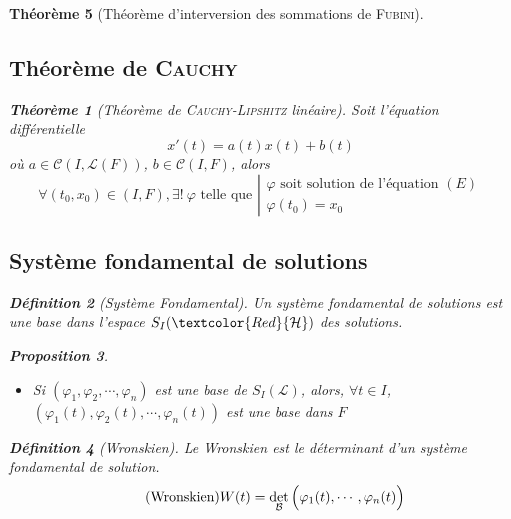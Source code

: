 \documentclass[11pt,a4paper]{report}
\newtheorem{theorem}{Théorème}[chapter]
\newtheorem{itheorem}[theorem]{Théorème}
\newtheorem{prop}[theorem]{Proposition}
\theoremstyle{definition}
\newtheorem{dfn}[theorem]{Définition}
\begin{document}
\begin{theorem}[Théorème d'interversion des sommations de \textsc{Fubini}]
{{\subsection{Théorème de \textsc{Cauchy}} %
\label{sub:theoreme_de_Cauchy}
\begin{itheorem}[Théorème de \textsc{Cauchy-Lipshitz} linéaire]\label{th:CauchyLipschitz}
Soit l'équation différentielle 
\begin{equation}\tag{$E$}
 x'(t) = a(t) x(t) + b(t)
\end{equation}
où $a \in \mathcal{C}\left( I,\mathscr{L}(F)\right)$, $b\in \mathcal{C}(I,F)$, alors
\begin{equation}
    \forall (t_0,x_0) \in (I,F), \exists ! \: \varphi \text{ telle que }
    \left|
    \begin{array}{l}
        \varphi \text{ soit solution de l'équation }(E)\\
        \varphi(t_0)=x_0
    \end{array}
    \right.
\end{equation}
\end{itheorem}

\subsection{Système fondamental de solutions} %
\label{sub:systeme_fondamental_de_solutions}
\begin{dfn}[Système Fondamental]
Un \emph{système fondamental} de solutions est une base dans l'espace $S_I(\textcolor{Red}{\mathcal{H}})$ des solutions.
\end{dfn}
%
\begin{prop}
    \begin{itemize}
        \item Si $(\varphi_1, \varphi_2, \cdots , \varphi_n)$ est une base de $S_I(\mathscr{L})$, alors, $\forall t \in I$, $\left( \varphi_1(t), \varphi_2(t), \cdots , \varphi_n(t) \right)
$ est une base dans $ F$
    \end{itemize}
\end{prop}
%
\begin{dfn}[Wronskien]
Le Wronskien est le déterminant d'un système fondamental de solution. 
\begin{equation}\label{Wronskien}\tag{Wronskien}
  W(t) = \det_\mathcal{B}\left( \vphantom{{3^3}^3} \varphi_1(t),\cdots , \varphi_n(t) \right)
\end{equation}
\end{dfn}

}}
\end{theorem}
\end{document}
